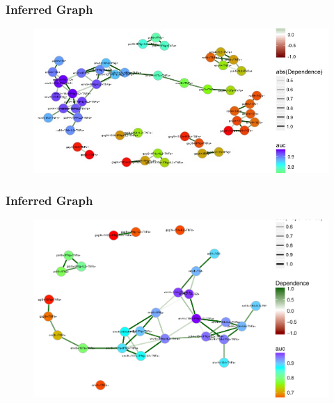 \documentclass{beamer}
\theoremstyle{definition}
\begin{document}

\begin{frame}
\frametitle{Inferred Graph}
\begin{figure}[]
\includegraphics[width=12 cm]{figures/HVTNnetworkAll}
\end{figure}
\end{frame}


\begin{frame}
\frametitle{Inferred Graph}
\begin{figure}[]
\includegraphics[width=11 cm]{figures/HVTNgraphSigPdf}
\end{figure}
\end{frame}

\end{document}
